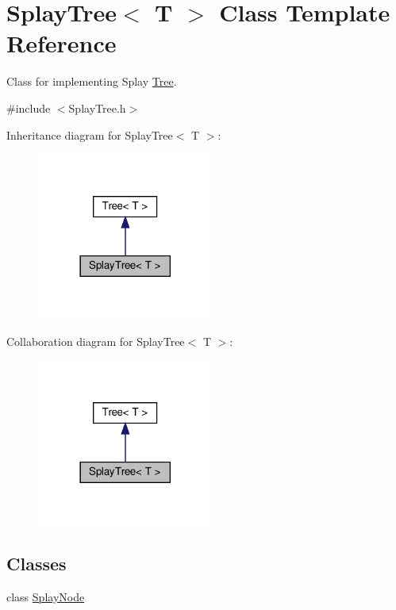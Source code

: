 \hypertarget{classSplayTree}{}\section{Splay\+Tree$<$ T $>$ Class Template Reference}
\label{classSplayTree}


Class for implementing Splay \hyperlink{classTree}{Tree}.  




{\ttfamily \#include $<$Splay\+Tree.\+h$>$}



Inheritance diagram for Splay\+Tree$<$ T $>$\+:
\nopagebreak
\begin{figure}[H]
\begin{center}
\leavevmode
\includegraphics[width=165pt]{classSplayTree__inherit__graph}
\end{center}
\end{figure}


Collaboration diagram for Splay\+Tree$<$ T $>$\+:
\nopagebreak
\begin{figure}[H]
\begin{center}
\leavevmode
\includegraphics[width=165pt]{classSplayTree__coll__graph}
\end{center}
\end{figure}
\subsection*{Classes}
\begin{DoxyCompactItemize}
\item 
class \hyperlink{classSplayTree_1_1SplayNode}{Splay\+Node}
\end{DoxyCompactItemize}
